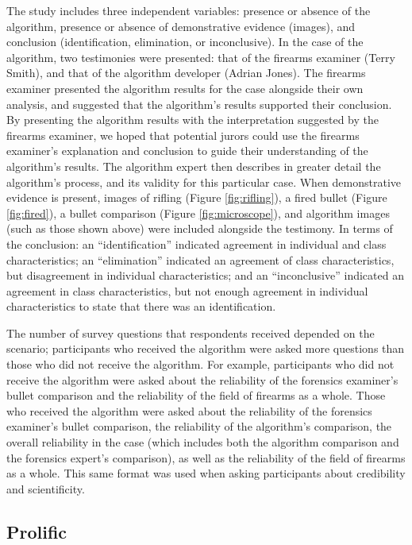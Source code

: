 \documentclass[print]{nuthesis}
\begin{document}
The study includes three independent variables: presence or absence of the algorithm, presence or absence of demonstrative evidence (images), and conclusion (identification, elimination, or inconclusive).
In the case of the algorithm, two testimonies were presented: that of the firearms examiner (Terry Smith), and that of the algorithm developer (Adrian Jones).
The firearms examiner presented the algorithm results for the case alongside their own analysis, and suggested that the algorithm's results supported their conclusion.
By presenting the algorithm results with the interpretation suggested by the firearms examiner, we hoped that potential jurors could use the firearms examiner's explanation and conclusion to guide their understanding of the algorithm's results.
The algorithm expert then describes in greater detail the algorithm's process, and its validity for this particular case.
When demonstrative evidence is present, images of rifling (Figure \ref{fig:rifling}), a fired bullet (Figure \ref{fig:fired}), a bullet comparison (Figure \ref{fig:microscope}), and algorithm images (such as those shown above) were included alongside the testimony.
In terms of the conclusion: an ``identification'' indicated agreement in individual and class characteristics; an ``elimination'' indicated an agreement of class characteristics, but disagreement in individual characteristics; and an ``inconclusive'' indicated an agreement in class characteristics, but not enough agreement in individual characteristics to state that there was an identification.

The number of survey questions that respondents received depended on the scenario; participants who received the algorithm were asked more questions than those who did not receive the algorithm.
For example, participants who did not receive the algorithm were asked about the reliability of the forensics examiner's bullet comparison and the reliability of the field of firearms as a whole.
Those who received the algorithm were asked about the reliability of the forensics examiner's bullet comparison, the reliability of the algorithm's comparison, the overall reliability in the case (which includes both the algorithm comparison and the forensics expert's comparison), as well as the reliability of the field of firearms as a whole.
This same format was used when asking participants about credibility and scientificity.

\hypertarget{prolific}{%
\subsection{Prolific}\label{prolific}}
\end{document}
